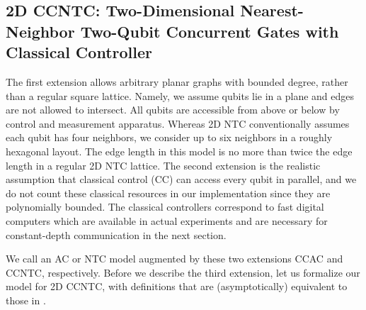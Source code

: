 \documentclass[twoside]{article}
\begin{document}
\subsection{\textsc{2D CCNTC}: Two-Dimensional Nearest-Neighbor Two-Qubit Concurrent Gates with Classical Controller}
\label{subsec:2dccntc}

The first extension allows arbitrary planar graphs
with bounded degree, rather than a regular square lattice.
Namely, we assume qubits lie in a plane and edges are not allowed to intersect.
All qubits are accessible from above
or below by control and measurement apparatus.
Whereas 2D NTC conventionally assumes each qubit
has four neighbors, we consider up to six neighbors in a roughly hexagonal
layout. The edge length in this model is no more than twice the edge length
in a regular 2D NTC lattice. The second extension is the realistic assumption
that classical control (CC) can
access every qubit in parallel, and we do not count these classical
resources in our implementation since they are polynomially bounded. The
classical controllers
correspond to fast digital computers which are
available in actual experiments and are necessary for constant-depth
communication in the next section.

We call an AC or NTC model augmented by these two extensions
\textsc{CCAC} and \textsc{CCNTC}, respectively. Before we describe the
third extension, let us formalize our model for \textsc{2D CCNTC}, with definitions that are (asymptotically) equivalent to those in 
\cite{Rosenbaum2012}.
\end{document}
